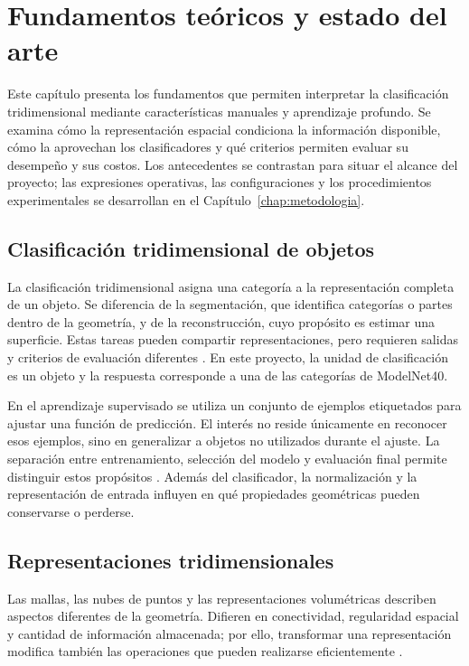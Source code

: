 \chapter{Fundamentos teóricos y estado del arte}
\label{chap:fundamentos}

Este capítulo presenta los fundamentos que permiten interpretar la clasificación tridimensional mediante características manuales y aprendizaje profundo. Se examina cómo la representación espacial condiciona la información disponible, cómo la aprovechan los clasificadores y qué criterios permiten evaluar su desempeño y sus costos. Los antecedentes se contrastan para situar el alcance del proyecto; las expresiones operativas, las configuraciones y los procedimientos experimentales se desarrollan en el Capítulo~\ref{chap:metodologia}.

\section{Clasificación tridimensional de objetos}
\label{sec:clasificacion-3d}
La clasificación tridimensional asigna una categoría a la representación completa de un objeto. Se diferencia de la segmentación, que identifica categorías o partes dentro de la geometría, y de la reconstrucción, cuyo propósito es estimar una superficie. Estas tareas pueden compartir representaciones, pero requieren salidas y criterios de evaluación diferentes \parencite{guo2021}. En este proyecto, la unidad de clasificación es un objeto y la respuesta corresponde a una de las categorías de ModelNet40.

En el aprendizaje supervisado se utiliza un conjunto de ejemplos etiquetados para ajustar una función de predicción. El interés no reside únicamente en reconocer esos ejemplos, sino en generalizar a objetos no utilizados durante el ajuste. La separación entre entrenamiento, selección del modelo y evaluación final permite distinguir estos propósitos \parencite{goodfellow2016}. Además del clasificador, la normalización y la representación de entrada influyen en qué propiedades geométricas pueden conservarse o perderse.

\section{Representaciones tridimensionales}
\label{sec:representaciones-3d}
Las mallas, las nubes de puntos y las representaciones volumétricas describen aspectos diferentes de la geometría. Difieren en conectividad, regularidad espacial y cantidad de información almacenada; por ello, transformar una representación modifica también las operaciones que pueden realizarse eficientemente \parencite{guo2021}.

